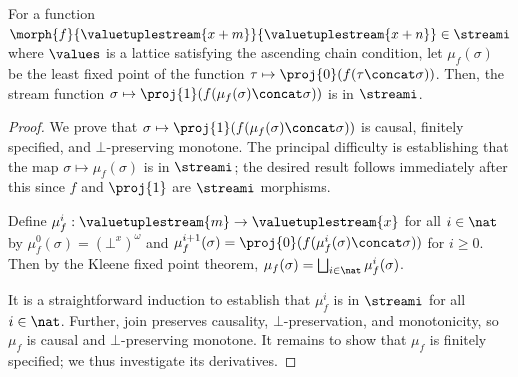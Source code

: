 \documentclass{lmcs}
\begin{document}
\begin{thm}\label{thm:trace-well-defined}
    For a function \(
    \morph{f}{\valuetuplestream{x+m}}{\valuetuplestream{x+n}} \in \streami
    \)
    where $\values$ is a lattice satisfying the ascending chain condition,
    let \(\mu_f(\sigma)\) be the least fixed point of the function \(
    \tau \mapsto \proj{0}\mleft(f(\tau \concat \sigma)\mright)
    \).
    Then, the stream function \(
    \sigma \mapsto \proj{1}\mleft(f(\mu_f(\sigma) \concat \sigma)\mright)
    \) is in \(\streami\).
\end{thm}
\begin{proof}
    We prove that
    \(\sigma \mapsto \proj{1}\mleft(f(\mu_f(\sigma) \concat \sigma)\mright)\)
    is causal, finitely specified, and \(\bot\)-preserving monotone.
    The principal difficulty is establishing that the map
    \(\sigma \mapsto \mu_f(\sigma)\) is in \(\streami\);
    the desired result follows immediately after this since \(f\) and
    \(\proj{1}\) are \(\streami\) morphisms.

    Define \(\mu_f^i: \valuetuplestream{m} \to \valuetuplestream{x}\)
    for all \(i \in \nat\)
    by \(\mu_f^0(\sigma) = (\bot^x)^\omega\) and
    \(\mu_f^{i+1}(\sigma) = \proj{0}(f(\mu_f^i(\sigma) \concat \sigma))\) for \(i \geq 0\).
    Then by the Kleene fixed point theorem,
    \(\mu_f(\sigma) = \bigsqcup_{i \in \nat} \mu_f^i(\sigma)\).

    It is a straightforward induction to establish that \(\mu_f^i\)
    is in \(\streami\) for all \(i \in \nat\).
    Further, join preserves causality, \(\bot\)-preservation, and monotonicity,
    so \(\mu_f\) is causal and \(\bot\)-preserving monotone.
    It remains to show that \(\mu_f\) is finitely specified;
    we thus investigate its derivatives.


\end{proof}
\end{document}
